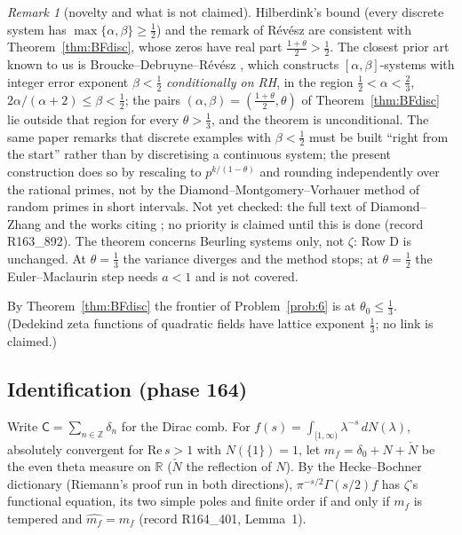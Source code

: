 \documentclass[11pt]{amsart}
\theoremstyle{definition}
\theoremstyle{remark}
\newtheorem{remark}[theorem]{Remark}
\newcommand{\Rel}{\mathrm{Re}\,}
\begin{document}
\begin{remark}[novelty and what is not claimed]\label{rem:BFnovelty}
Hilberdink's bound (every discrete system has $\max\{\alpha,\beta\}\ge\frac12$) and the remark of R\'ev\'esz
\cite[Rem.~7]{Revesz2023} are consistent with Theorem~\ref{thm:BFdisc}, whose zeros have real part $\frac{1+\theta}2>\frac12$.
The closest prior art known to us is Broucke--Debruyne--R\'ev\'esz \cite[Thm.~1.3]{BDR2023}, which constructs
$[\alpha,\beta]$-systems with integer error exponent $\beta<\frac12$ \emph{conditionally on RH}, in the region
$\frac12<\alpha<\frac23$, $2\alpha/(\alpha+2)\le\beta<\frac12$; the pairs $(\alpha,\beta)=(\frac{1+\theta}2,\theta)$ of
Theorem~\ref{thm:BFdisc} lie outside that region for every $\theta>\frac13$, and the theorem is unconditional. The same paper
remarks that discrete examples with $\beta<\frac12$ must be built ``right from the start'' rather than by discretising a
continuous system; the present construction does so by rescaling to $p^{k/(1-\theta)}$ and rounding independently over the
rational primes, not by the Diamond--Montgomery--Vorhauer method of random primes in short intervals. Not yet checked: the
full text of Diamond--Zhang \cite[Ch.~17]{DiamondZhang2016} and the works citing \cite{BDR2023}; no priority is claimed until
this is done (record R163\_892). The theorem concerns Beurling systems only, not $\zeta$: Row D is unchanged. At $\theta=\frac13$ the
variance diverges and the method stops; at $\theta=\frac12$ the Euler--Maclaurin step needs $a<1$ and is not covered.
\end{remark}

\noindent By Theorem~\ref{thm:BFdisc} the frontier of Problem~\ref{prob:6} is at $\theta_0\le\frac13$. (Dedekind zeta
functions of quadratic fields have lattice exponent $\frac13$; no link is claimed.)

\subsection{Identification (phase 164)}\label{subsec:identification}
Write $\mathsf C=\sum_{n\in\mathbb Z}\delta_n$ for the Dirac comb. For $f(s)=\int_{[1,\infty)}\lambda^{-s}\,dN(\lambda)$,
absolutely convergent for $\Rel s>1$ with $N(\{1\})=1$, let $m_f=\delta_0+N+\check N$ be the even theta measure on $\mathbb R$
($\check N$ the reflection of $N$). By the Hecke--Bochner dictionary (Riemann's proof run in both directions), $\pi^{-s/2}\Gamma(s/2)f$
has $\zeta$'s functional equation, its two simple poles and finite order if and only if $m_f$ is tempered and $\widehat{m_f}=m_f$
(record R164\_401, Lemma~1).
\end{document}

